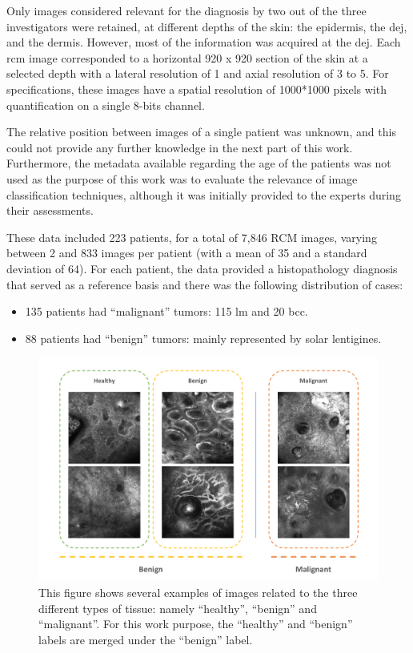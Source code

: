 \documentclass[journal,article,accept,moreauthors,pdftex, applsci]{Definitions/mdpi}
\begin{document}
Only images considered relevant for the diagnosis by two out of the three investigators were retained, at different depths of the skin: the epidermis, the \ac{dej}, and the dermis. However, most of the information was acquired at the \ac{dej}. Each \ac{rcm} image corresponded to a horizontal \unit{920}{\micro\meter} x \unit{920}{\micro\meter} section of the skin at a selected depth with a lateral resolution of \unit{1}{\micro\meter} and axial resolution of \unit{3}{\micro\meter} to \unit{5}{\micro\meter}. For specifications, these images have a spatial resolution of 1000*1000 pixels with quantification on a single 8-bits channel.\par
The relative position between images of a single patient was unknown, and this could not provide any further knowledge in the next part of this work. Furthermore, the metadata available regarding the age of the patients was not used as the purpose of this work was to evaluate the relevance of image classification techniques, although it was initially provided to the experts during their assessments.\par
These data included 223 patients, for a total of 7,846 RCM images, varying between 2 and 833 images per patient (with a mean of 35 and a standard deviation of 64). For each patient, the data provided a histopathology diagnosis that served as a reference basis and there was the following distribution of cases:
\begin{itemize}
\item 135 patients had “malignant” tumors: 115 \ac{lm} and 20 \ac{bcc}.
\item 88 patients had “benign” tumors: mainly represented by solar lentigines.
\end{itemize}\par
\begin{figure}[H]
    \begin{center}
        \includegraphics[width=\linewidth]{Figures/Data.pdf}
        \caption{This figure shows several examples of images related to the three different types of tissue: namely “healthy”, “benign” and “malignant”. For this work purpose, the “healthy” and “benign” labels are merged under the “benign” label.}
        \label{fig:data}
    \end{center} 
\end{figure}\par
\end{document}

